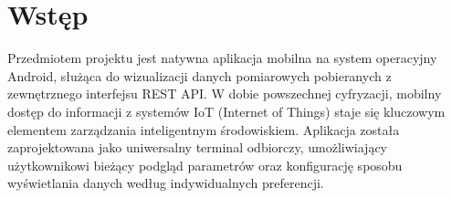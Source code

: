 \chapter*{Wstęp}

Przedmiotem projektu jest natywna aplikacja mobilna na system operacyjny Android, służąca do wizualizacji danych pomiarowych pobieranych z zewnętrznego interfejsu REST API. W dobie powszechnej cyfryzacji, mobilny dostęp do informacji z systemów IoT (Internet of Things) staje się kluczowym elementem zarządzania inteligentnym środowiskiem. Aplikacja została zaprojektowana jako uniwersalny terminal odbiorczy, umożliwiający użytkownikowi bieżący podgląd parametrów oraz konfigurację sposobu wyświetlania danych według indywidualnych preferencji.